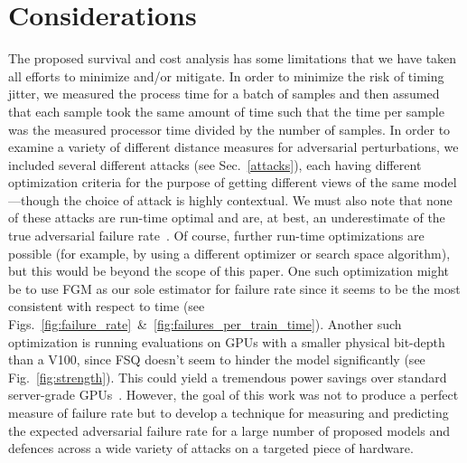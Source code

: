\section{Considerations}
The proposed survival and cost analysis  has some limitations that we have taken all efforts to minimize and/or mitigate. In order to minimize the risk of timing jitter, we measured the process time for a batch of samples and then assumed that each sample took the same amount of time such that the time per sample was the measured processor time divided by the number of samples. In order to examine a variety of different distance measures for adversarial perturbations, we included several different attacks (see Sec.~\ref{attacks}), each having different optimization criteria for the purpose of getting different views of the same model---though the choice of attack is highly contextual. We must also note that none of these attacks are run-time optimal and are, at best, an underestimate of the true adversarial failure rate~\citep{meyers}. Of course, further run-time optimizations are possible (for example, by using a different optimizer or search space algorithm), but this would be beyond the scope of this paper. 
One such optimization might be to use FGM as our sole estimator for failure rate since it seems to be the most consistent with respect to time (see Figs.~\ref{fig:failure_rate}~\&~\ref{fig:failures_per_train_time}).
Another such optimization is running evaluations on GPUs with a smaller physical bit-depth than a V100, since FSQ doesn't seem to hinder the model significantly (see Fig.~\ref{fig:strength}). This could yield a tremendous power savings over standard server-grade GPUs~\citep{chou2023applicability}.
However, the goal of this work was not to produce a perfect measure of failure rate but to develop a technique for measuring and predicting the expected adversarial failure rate for a large number of proposed models and defences across a wide variety of attacks on a targeted piece of hardware.

